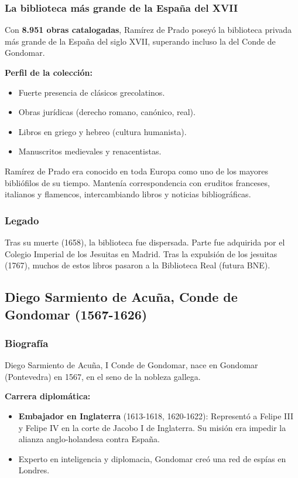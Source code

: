 \documentclass[11pt,a4paper]{article}
\begin{document}
\subsubsection{La biblioteca más grande de la España del XVII}

Con \textbf{8.951 obras catalogadas}, Ramírez de Prado poseyó la biblioteca privada más grande de la España del siglo XVII, superando incluso la del Conde de Gondomar.

\textbf{Perfil de la colección:}
\begin{itemize}
\item Fuerte presencia de clásicos grecolatinos.
\item Obras jurídicas (derecho romano, canónico, real).
\item Libros en griego y hebreo (cultura humanista).
\item Manuscritos medievales y renacentistas.
\end{itemize}

Ramírez de Prado era conocido en toda Europa como uno de los mayores bibliófilos de su tiempo. Mantenía correspondencia con eruditos franceses, italianos y flamencos, intercambiando libros y noticias bibliográficas.

\subsubsection{Legado}

Tras su muerte (1658), la biblioteca fue dispersada. Parte fue adquirida por el Colegio Imperial de los Jesuitas en Madrid. Tras la expulsión de los jesuitas (1767), muchos de estos libros pasaron a la Biblioteca Real (futura BNE).

\subsection{Diego Sarmiento de Acuña, Conde de Gondomar (1567-1626)}

\subsubsection{Biografía}

Diego Sarmiento de Acuña, I Conde de Gondomar, nace en Gondomar (Pontevedra) en 1567, en el seno de la nobleza gallega.

\textbf{Carrera diplomática:}
\begin{itemize}
\item \textbf{Embajador en Inglaterra} (1613-1618, 1620-1622): Representó a Felipe III y Felipe IV en la corte de Jacobo I de Inglaterra. Su misión era impedir la alianza anglo-holandesa contra España.
\item Experto en inteligencia y diplomacia, Gondomar creó una red de espías en Londres.
\end{itemize}
\end{document}
